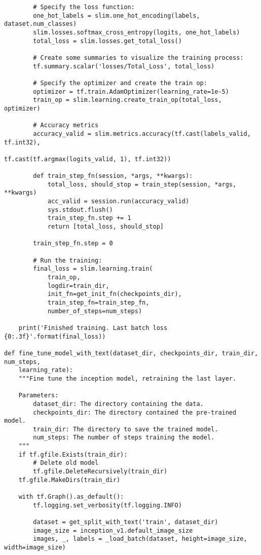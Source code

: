 \begin{lstlisting}
        # Specify the loss function:
        one_hot_labels = slim.one_hot_encoding(labels, dataset.num_classes)
        slim.losses.softmax_cross_entropy(logits, one_hot_labels)
        total_loss = slim.losses.get_total_loss()

        # Create some summaries to visualize the training process:
        tf.summary.scalar('losses/Total_Loss', total_loss)
      
        # Specify the optimizer and create the train op:
        optimizer = tf.train.AdamOptimizer(learning_rate=1e-5)
        train_op = slim.learning.create_train_op(total_loss, optimizer)

        # Accuracy metrics
        accuracy_valid = slim.metrics.accuracy(tf.cast(labels_valid, tf.int32),
                                               tf.cast(tf.argmax(logits_valid, 1), tf.int32))

        def train_step_fn(session, *args, **kwargs):
            total_loss, should_stop = train_step(session, *args, **kwargs)
            acc_valid = session.run(accuracy_valid)
            sys.stdout.flush()
            train_step_fn.step += 1
            return [total_loss, should_stop]
        
        train_step_fn.step = 0

        # Run the training:
        final_loss = slim.learning.train(
            train_op,
            logdir=train_dir,
            init_fn=get_init_fn(checkpoints_dir),
            train_step_fn=train_step_fn,
            number_of_steps=num_steps)
            
    print('Finished training. Last batch loss {0:.3f}'.format(final_loss))

def fine_tune_model_with_text(dataset_dir, checkpoints_dir, train_dir, num_steps, 
    learning_rate):
    """Fine tune the inception model, retraining the last layer.

    Parameters:
        dataset_dir: The directory containing the data.
        checkpoints_dir: The directory contained the pre-trained model.
        train_dir: The directory to save the trained model.
        num_steps: The number of steps training the model.
    """
    if tf.gfile.Exists(train_dir):
        # Delete old model
        tf.gfile.DeleteRecursively(train_dir)
    tf.gfile.MakeDirs(train_dir)

    with tf.Graph().as_default():
        tf.logging.set_verbosity(tf.logging.INFO)
        
        dataset = get_split_with_text('train', dataset_dir)
        image_size = inception_v1.default_image_size
        images, _, labels = _load_batch(dataset, height=image_size, width=image_size)
        

\end{lstlisting}
